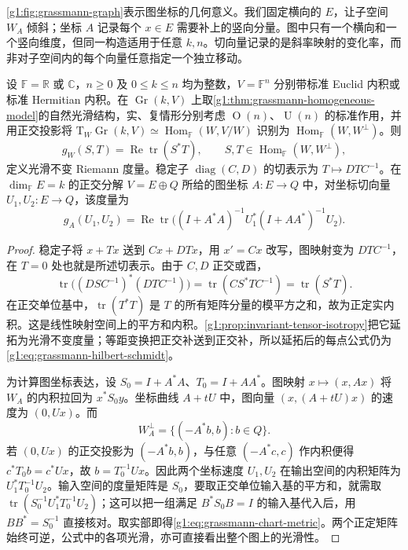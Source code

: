 

\cref{g1:fig:grassmann-graph}表示图坐标的几何意义。我们固定横向的 \(E\)，让子空间 \(W_A\) 倾斜；坐标 \(A\) 记录每个 \(x\in E\) 需要补上的竖向分量。图中只有一个横向和一个竖向维度，但同一构造适用于任意 \(k,n\)。切向量记录的是斜率映射的变化率，而非对子空间内的每个向量任意指定一个独立移动。

\begin{proposition}\label{g1:prop:grassmann-invariant-metric}
	设 \(\mathbb F=\mathbb R\) 或 \(\mathbb C\)，\(n\ge0\) 及 \(0\leq k\leq n\) 均为整数，\(V=\mathbb F^n\) 分别带标准 Euclid 内积或标准 Hermitian 内积。在 \(\operatorname{Gr}(k,V)\) 上取\cref{g1:thm:grassmann-homogeneous-model}的自然光滑结构，实、复情形分别考虑 \(\operatorname{O}(n)\)、\(\operatorname{U}(n)\) 的标准作用，并用正交投影将 \(\mathrm{T}_W\operatorname{Gr}(k,V)\simeq\operatorname{Hom}_{\mathbb F}(W,V/W)\) 识别为 \(\operatorname{Hom}_{\mathbb F}(W,W^\perp)\)。则
	\begin{equation}\label{g1:eq:grassmann-hilbert-schmidt}
		g_W(S,T)=\operatorname{Re}\operatorname{tr}(S^*T),
		\qquad S,T\in\operatorname{Hom}_{\mathbb F}(W,W^\perp),
	\end{equation}
	定义光滑不变 Riemann 度量。稳定子 \(\operatorname{diag}(C,D)\) 的切表示为 \(T\mapsto DTC^{-1}\)。在 \(\dim_{\mathbb F}E=k\) 的正交分解 \(V=E\oplus Q\) 所给的图坐标 \(A:E\to Q\) 中，对坐标切向量 \(U_1,U_2:E\to Q\)，该度量为
	\begin{equation}\label{g1:eq:grassmann-chart-metric}
		g_A(U_1,U_2)=\operatorname{Re}\operatorname{tr}
		\bigl((I+A^*A)^{-1}U_1^*(I+AA^*)^{-1}U_2\bigr).
	\end{equation}
\end{proposition}
\begin{proof}
	稳定子将 \(x+Tx\) 送到 \(Cx+DTx\)，用 \(x'=Cx\) 改写，图映射变为 \(DTC^{-1}\)，在 \(T=0\) 处也就是所述切表示。由于 \(C,D\) 正交或酉，
	\[
		\operatorname{tr}\bigl((DSC^{-1})^*(DTC^{-1})\bigr)
		=\operatorname{tr}(CS^*TC^{-1})=\operatorname{tr}(S^*T).
	\]
	在正交单位基中，\(\operatorname{tr}(T^*T)\) 是 \(T\) 的所有矩阵分量的模平方之和，故为正定实内积。这是线性映射空间上的平方和内积。\cref{g1:prop:invariant-tensor-isotropy}把它延拓为光滑不变度量；等距变换把正交补送到正交补，所以延拓后的每点公式仍为\eqref{g1:eq:grassmann-hilbert-schmidt}。

	为计算图坐标表达，设 \(S_0=I+A^*A\)、\(T_0=I+AA^*\)。图映射 \(x\mapsto(x,Ax)\) 将 \(W_A\) 的内积拉回为 \(x^*S_0y\)。坐标曲线 \(A+tU\) 中，图向量 \((x,(A+tU)x)\) 的速度为 \((0,Ux)\)。而
	\[
		W_A^\perp=\{(-A^*b,b):b\in Q\}.
	\]
	若 \((0,Ux)\) 的正交投影为 \((-A^*b,b)\)，与任意 \((-A^*c,c)\) 作内积便得 \(c^*T_0b=c^*Ux\)，故 \(b=T_0^{-1}Ux\)。因此两个坐标速度 \(U_1,U_2\) 在输出空间的内积矩阵为 \(U_1^*T_0^{-1}U_2\)。输入空间的度量矩阵是 \(S_0\)，要取正交单位输入基的平方和，就需取 \(\operatorname{tr}(S_0^{-1}U_1^*T_0^{-1}U_2)\)；这可以把一组满足 \(B^*S_0B=I\) 的输入基代入后，用 \(BB^*=S_0^{-1}\) 直接核对。取实部即得\eqref{g1:eq:grassmann-chart-metric}。两个正定矩阵始终可逆，公式中的各项光滑，亦可直接看出整个图上的光滑性。
\end{proof}

